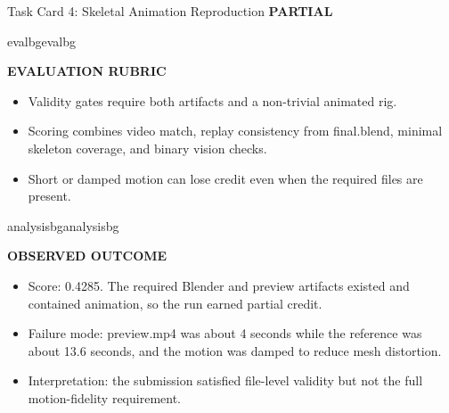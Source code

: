 \documentclass{llmxive}
\providecommand{\StatusBadge}[3]{\begingroup\setlength{\fboxsep}{3pt}\colorbox{#2}{\textbf{#1}}\endgroup}
\providecommand{\BlockTitle}[1]{{\raggedright\textbf{\footnotesize #1}\par}\vspace{2pt}}
\begin{document}
\begin{ColorTaskCard}{Task Card 4: Skeletal Animation Reproduction \hfill \StatusBadge{PARTIAL}{partialbg}{partialorange}}
\begin{minipage}[t]{0.49\linewidth}
\end{minipage}\hfill
\begin{minipage}[t]{0.49\linewidth}
\vspace{0pt}
\begin{CardBlock}{evalbg}{evalbg}
\BlockTitle{EVALUATION RUBRIC}
\begin{itemize}
\item Validity gates require both artifacts and a non-trivial animated rig.
\item Scoring combines video match, replay consistency from final.blend, minimal skeleton coverage, and binary vision checks.
\item Short or damped motion can lose credit even when the required files are present.
\end{itemize}
\end{CardBlock}

\begin{CardBlock}{analysisbg}{analysisbg}
\BlockTitle{OBSERVED OUTCOME}
\begin{itemize}
\item Score: 0.4285. The required Blender and preview artifacts existed and contained animation, so the run earned partial credit.
\item Failure mode: preview.mp4 was about 4 seconds while the reference was about 13.6 seconds, and the motion was damped to reduce mesh distortion.
\item Interpretation: the submission satisfied file-level validity but not the full motion-fidelity requirement.
\end{itemize}
\end{CardBlock}
\end{minipage}
\end{ColorTaskCard}
\end{document}
